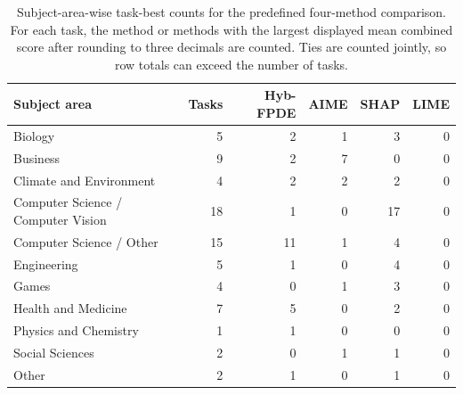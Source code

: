 \begin{table}[!tbp]
    \caption{Subject-area-wise task-best counts for the predefined four-method comparison. For each task, the method or methods with the largest displayed mean combined score after rounding to three decimals are counted. Ties are counted jointly, so row totals can exceed the number of tasks.}
    \label{tab:subject_area_winner_counts}
    \centering
    \begin{tabular*}{\textwidth}{@{\extracolsep{\fill}}l r rrrr@{}}
        \toprule
        Subject area & Tasks & Hyb-FPDE & AIME & SHAP & LIME  \\
        \midrule
        Biology & 5 & 2 & 1 & 3 & 0 \\
        Business & 9 & 2 & 7 & 0 & 0 \\
        Climate and Environment & 4 & 2 & 2 & 2 & 0 \\
        Computer Science / Computer Vision & 18 & 1 & 0 & 17 & 0 \\
        Computer Science / Other & 15 & 11 & 1 & 4 & 0 \\
        Engineering & 5 & 1 & 0 & 4 & 0 \\
        Games & 4 & 0 & 1 & 3 & 0 \\
        Health and Medicine & 7 & 5 & 0 & 2 & 0 \\
        Physics and Chemistry & 1 & 1 & 0 & 0 & 0 \\
        Social Sciences & 2 & 0 & 1 & 1 & 0 \\
        Other & 2 & 1 & 0 & 1 & 0 \\
        \bottomrule
    \end{tabular*}
\end{table}
